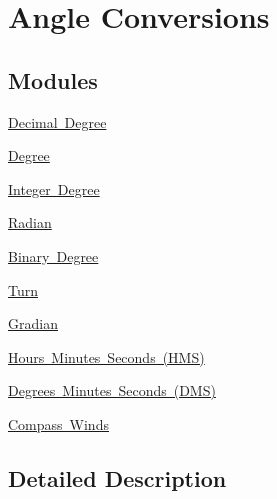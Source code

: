 \hypertarget{group___e_g_x_math-_angle_conversions}{}\section{Angle Conversions}
\label{group___e_g_x_math-_angle_conversions}
\subsection*{Modules}
\begin{DoxyCompactItemize}
\item 
\mbox{\hyperlink{group___e_g_x_math-_angle_conversions-_decimal_degree}{Decimal Degree}}
\item 
\mbox{\hyperlink{group___e_g_x_math-_angle_conversions-_degree}{Degree}}
\item 
\mbox{\hyperlink{group___e_g_x_math-_angle_conversions-_integer_degree}{Integer Degree}}
\item 
\mbox{\hyperlink{group___e_g_x_math-_angle_conversions-_radian}{Radian}}
\item 
\mbox{\hyperlink{group___e_g_x_math-_angle_conversions-_binary_degree}{Binary Degree}}
\item 
\mbox{\hyperlink{group___e_g_x_math-_angle_conversions-_turn}{Turn}}
\item 
\mbox{\hyperlink{group___e_g_x_math-_angle_conversions-_gradian}{Gradian}}
\item 
\mbox{\hyperlink{group___e_g_x_math-_angle_conversions-_h_m_s}{Hours Minutes Seconds (\+H\+M\+S)}}
\item 
\mbox{\hyperlink{group___e_g_x_math-_angle_conversions-_d_m_s}{Degrees Minutes Seconds (\+D\+M\+S)}}
\item 
\mbox{\hyperlink{group___e_g_x_math-_angle_conversions-_compass_winds}{Compass Winds}}
\end{DoxyCompactItemize}


\subsection{Detailed Description}
